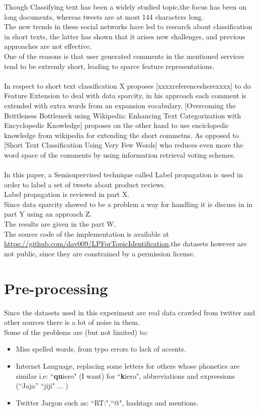 \documentclass[4pt,a4paper,twocolumn]{article}
\begin{document}
Though Classifying text has been a widely studied topic,the focus has been on long documents,
whereas tweets are at most 144 characters long.\\
The new trends in these social networks have led to research about classification in short texts, the latter has  shown that it arises new challenges, and previous approaches are not  effective.\\
One of the reasons is that  user generated comments in the mentioned services tend to be extremly short, leading to sparce feature representations.\\
\\
In respect to short text classification X proposes [xxxxreferencesherexxxx] to do Feature Extension to deal with data sparcity, in his approach each comment is extended with extra words from an expansion vocabulary.
[Overcoming the Brittleness Bottleneck using Wikipedia:
Enhancing Text Categorization with Encyclopedic Knowledge] proposes on the other hand to use enciclopedic knowledge from wikipedia for extending the short commetns.
As opposed to [Short Text Classification Using Very Few Words] who reduces even more the word space of the comments by using information retrieval voting schemes.\\
\\
In this paper, a Semisupervised technique called Label propagation is used
in order to label a set of tweets about product reviews.\\
Label propagation is reviewed in part X.\\
Since data sparcity showed to be a problem a way for handling it
is discuss in in part Y using an approach Z.\\
The results are given in the part W.\\
The source code of the implementation is available at \url{https://github.com/dav009/LPForTopicIdentification},the datasets however are not public, since they are constrained by a permission license.

\part*{Pre-processing}

Since the datasets used in this experiment are real data crawled from twitter and other sources there is a lot of noise in them.\\
Some of the problems are (but not limited) to:\\
\begin{itemize}
	\item Miss spelled words, from typo errors to lack of accents.
	\item Internet Language, replacing some letters for others whose phonetics are similar i.e: ``\textbf{qu}iero" (I want) for ``\textbf{k}iero", abbreviations and expressions (``Jaja'' ``jiji" ... )
	\item Twitter Jargon such as: ``RT:",``@", hashtags and mentions. 
\end{itemize} 
\end{document}
